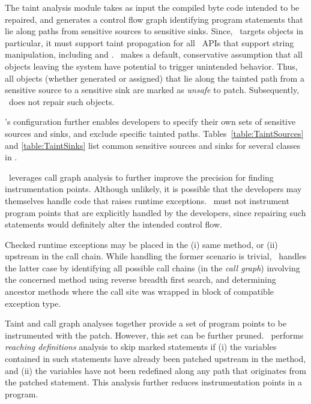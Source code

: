 The taint analysis module takes as input the compiled byte code intended to be
repaired, and generates a control flow graph identifying program statements that
lie along paths from sensitive sources to sensitive sinks. Since, \tool\ targets
 objects in particular, it must support taint propagation for all
\java\ APIs that support string manipulation, including  and
.
\tool\ makes a default, conservative assumption that all objects
leaving the system have potential to trigger unintended behavior. Thus, all
 objects (whether generated or assigned)
that lie along the tainted path from a sensitive source to a sensitive sink are
marked as \textit{unsafe} to patch. Subsequently, \tool\ does not repair such
 objects.

\tool's configuration further enables developers to specify their own sets of
sensitive sources and sinks, and exclude specific tainted paths.
Tables~\ref{table:TaintSources} and \ref{table:TaintSinks} list common
sensitive sources and sinks for several classes in \java.

 \tool\ leverages call graph analysis to
further improve the precision for finding instrumentation points. Although
unlikely, it is possible that the developers may themselves handle code that
raises runtime exceptions. \tool\ must not instrument program points that
are explicitly handled by the developers, since repairing such statements
would definitely alter the intended control flow.

Checked runtime exceptions may be placed in the (i) same method, or (ii)
upstream in the call chain. While handling the former scenario is trivial,
\tool\ handles the latter case by identifying all possible call chains (in
the \textit{call graph}) involving the concerned method using reverse breadth
first search, and determining ancestor methods where the call site was wrapped in
 block of compatible exception type.

 Taint and call graph analyses
together provide a set of program points to be instrumented with the
patch. However, this set can be further pruned. \tool\ performs \textit{reaching
definitions} analysis to skip marked statements if
(i) the  variables contained in such statements have already been
patched upstream in the method, and (ii) the variables have not been redefined along any
path that originates from the patched statement. This analysis further reduces
instrumentation points in a program.

